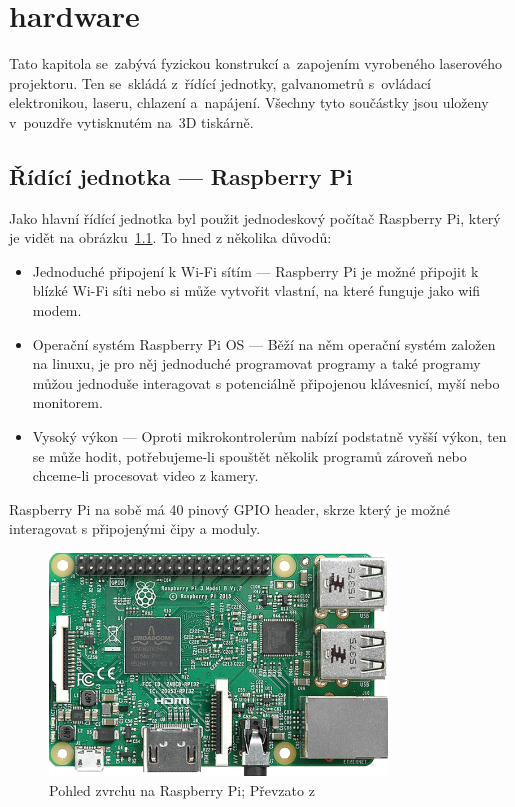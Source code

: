 \chapter{hardware}
Tato kapitola se~zabývá fyzickou konstrukcí a~zapojením vyrobeného laserového projektoru. Ten se~skládá z~řídící jednotky, galvanometrů s~ovládací elektronikou, laseru, chlazení a~napájení. Všechny tyto součástky jsou uloženy v~pouzdře vytisknutém na~3D tiskárně.

\section{Řídící jednotka --- Raspberry Pi}
Jako hlavní řídící jednotka byl použit jednodeskový počítač Raspberry Pi, který je vidět na obrázku~\ref{fig:RPi}. To hned z několika důvodů:
\begin{itemize}
  \item Jednoduché připojení k Wi-Fi sítím --- Raspberry Pi je možné připojit k blízké Wi-Fi síti nebo si může vytvořit vlastní, na které funguje jako wifi modem.
  \item Operační systém Raspberry Pi OS --- Běží na něm operační systém založen na linuxu, je pro něj jednoduché programovat programy a také programy můžou jednoduše interagovat s potenciálně připojenou klávesnicí, myší nebo monitorem.
  \item Vysoký výkon --- Oproti mikrokontrolerům nabízí podstatně vyšší výkon, ten se může hodit, potřebujeme-li spouštět několik programů zároveň nebo chceme-li procesovat video z kamery.
\end{itemize}
Raspberry Pi na sobě má 40 pinový GPIO header, skrze který je možné interagovat s připojenými čipy a moduly.

\begin{figure}[htb]
    \centering
  \includegraphics[width=0.8\textwidth]{img/RPi.png}
  \caption{\label{fig:RPi} Pohled zvrchu na Raspberry Pi; Převzato z~\cite{rpi-image}}
\end{figure}












